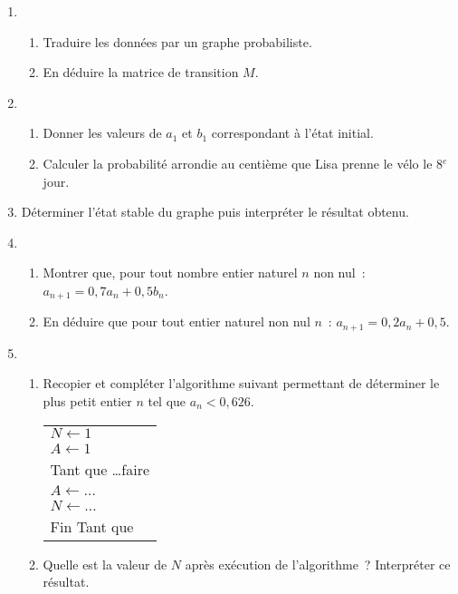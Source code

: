 \begin{enumerate}
     \item
     \begin{enumerate}[label=\alph*.]
          \item Traduire les données par un graphe probabiliste.
          \item En déduire la matrice de transition $M$.
     \end{enumerate}
     \item
     \begin{enumerate}[label=\alph*.]
          \item Donner les valeurs de $a_1$ et $b_1$ correspondant à l'état initial.
          \item Calculer la probabilité arrondie au centième que Lisa prenne le vélo le 8$^{e}$ jour.
     \end{enumerate}
     \item Déterminer l'état stable du graphe puis interpréter le résultat obtenu.
     \item
     \begin{enumerate}[label=\alph*.]
          \item Montrer que, pour tout nombre entier naturel $n$ non nul~: $a_{n+1} = 0,7a_n + 0,5b_n$.
          \item En déduire que pour tout entier naturel non nul $n$~: $a_{n+1} = 0,2a_n + 0,5$.
     \end{enumerate}
     \item
     \begin{enumerate}[label=\alph*.]
          \item Recopier et compléter l'algorithme suivant permettant de déterminer le plus petit entier $n$ tel que $a_n < 0,626$.
          \begin{center}
               \begin{extern}%
                    \begin{tabularx}{0.3\linewidth}{|X|}\hline
                         $N \gets 1$\\
                         $A \gets 1$\\
                         Tant que \ldots faire\\
                         \hspace{1cm}$A \gets \ldots$\\
                         \hspace{1cm}$N \gets \ldots $\\
                         Fin Tant que\\ \hline
                    \end{tabularx}
               \end{extern}
          \end{center}
          \item Quelle est la valeur de $N$ après exécution de l'algorithme~? Interpréter ce
          résultat.
     \end{enumerate}
\end{enumerate}
\medbreak
